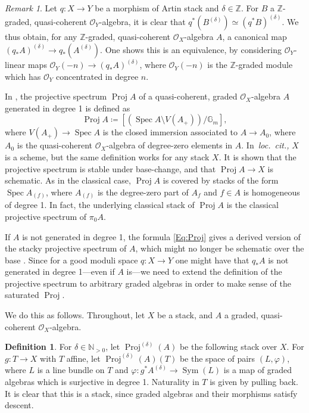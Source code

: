 \documentclass[a4paper,twoside,11pt]{amsart}
\theoremstyle{plain}
\theoremstyle{definition}
\newtheorem{definition}[theorem]{Definition}
\theoremstyle{remark}
\newtheorem{remark}[theorem]{Remark}
\numberwithin{equation}{section}
\newcommand{\NN}{\mathbb{N}} %
\newcommand{\ZZ}{\mathbb{Z}} %
\newcommand{\GG}{\mathbb{G}} %
\DeclareMathOperator{\Sym}{Sym} %
\DeclareMathOperator{\Spec}{Spec} %
\DeclareMathOperator{\Proj}{Proj} %
\newcommand{\oO}{\mathcal{O}}
\begin{document}
\begin{remark}
\label{Rem:push_delta_twist}
    Let $q \colon X \to Y$ be a morphism of Artin stack and $\delta \in \ZZ$. For $B$ a $\ZZ$-graded, quasi-coherent $\oO_Y$-algebra, it is clear that $q^*(B^{(\delta)}) \simeq (q^*B)^{(\delta)}$. We thus obtain, for any $\ZZ$-graded, quasi-coherent $\oO_X$-algebra $A$, a canonical map $(q_*A)^{(\delta)} \to q_*(A^{(\delta)})$. One shows this is an equivalence, by considering $\oO_Y$-linear maps $\oO_Y(-n) \to (q_*A)^{(\delta)}$, where $\oO_Y(-n)$ is the $\ZZ$-graded module which has $\oO_Y$ concentrated in degree $n$.
\end{remark}
 
 In \cite{Hekking}, the projective spectrum $\Proj A$ of a quasi-coherent, graded $\oO_X$-algebra $A$ generated in degree 1  is defined as
 \begin{equation}
 \label{Eq:Proj}
     \Proj  A \coloneqq [ (\Spec  A \setminus V(A_+)) / \GG_m ],
 \end{equation}
where $V(A_+) \to \Spec  A$ is the closed immersion associated to $A \to A_0$, where $A_0$ is the quasi-coherent $\oO_X$-algebra of degree-zero elements in $A$. In~\textit{loc.\ cit.,} $X$ is a scheme, but the same definition works for any stack $X$. It is shown that the projective spectrum is stable under base-change, and that $\Proj  A \to X$ is schematic. As in the classical case, $\Proj  A$ is covered by stacks of the form $\Spec  A_{(f)}$, where $A_{(f)}$ is the degree-zero part of $A_f$ and $f \in A$ is homogeneous of degree 1. In fact, the underlying classical stack of $\Proj A$ is the classical projective spectrum of $\pi_0A$.

If $A$ is not generated in degree 1, the formula \ref{Eq:Proj} gives a derived version of the stacky projective spectrum of $A$, which might no longer be schematic over the base \cite[\S 10.2.7]{Olsson}. Since for a good moduli space $q \colon X \to Y$ one might have that $q_*A$ is not generated in degree 1---even if $A$ is---we need to extend the definition of the projective spectrum to arbitrary graded algebras in order to make sense of the saturated $\Proj$. 

We do this as follows. Throughout, let $X$ be a stack, and $A$ a graded, quasi-coherent $\oO_X$-algebra.

\begin{definition}
    For $\delta \in \NN_{>0}$, let $\Proj ^{(\delta)}(A)$ be the following stack over $X$. For $g \colon T \to X$ with $T$ affine, let $\Proj ^{(\delta)}(A)(T)$ be the space of pairs $(L,\varphi)$, where $L$ is a line bundle on $T$ and $\varphi \colon g^*A^{(\delta)} \to \Sym(L)$ is a map of graded algebras which is surjective in degree 1. Naturality in $T$ is given by pulling back. It is clear that this is a stack, since graded algebras and their morphisms satisfy descent.
\end{definition}
\end{document}
